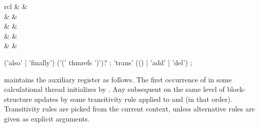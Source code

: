 \begin{isabellebody}
\begin{isamarkuptext}
  \begin{matharray}{rcl}
    \hyperlink{command.also}{\mbox{}} & \equiv & \hyperlink{command.note}{\mbox{}}~ \\
    \hyperlink{command.also}{\mbox{}} & \equiv & \hyperlink{command.note}{\mbox{}}~ \\[0.5ex]
    \hyperlink{command.finally}{\mbox{}} & \equiv & \hyperlink{command.also}{\mbox{}}~\hyperlink{command.from}{\mbox{}}~ \\[0.5ex]
    \hyperlink{command.moreover}{\mbox{}} & \equiv & \hyperlink{command.note}{\mbox{}}~ \\
    \hyperlink{command.ultimately}{\mbox{}} & \equiv & \hyperlink{command.moreover}{\mbox{}}~\hyperlink{command.from}{\mbox{}}~ \\
  \end{matharray}

  \begin{rail}
    ('also' | 'finally') ('(' thmrefs ')')?
    ;
    'trans' (() | 'add' | 'del')
    ;
  \end{rail}

  \begin{descr}

  \item [\hyperlink{command.also}{\mbox{\isa{\isacommand{also}}}}~\isa{{\isachardoublequote}{\isacharparenleft}a\isactrlsub {\isadigit{1}}\ {\isasymdots}\ a\isactrlsub n{\isacharparenright}{\isachardoublequote}}]
  maintains the auxiliary \hyperlink{fact.calculation}{\mbox{}} register as follows.
  The first occurrence of \hyperlink{command.also}{\mbox{}} in some calculational
  thread initializes \hyperlink{fact.calculation}{\mbox{}} by \hyperlink{fact.this}{\mbox{}}. Any
  subsequent \hyperlink{command.also}{\mbox{}} on the same level of block-structure
  updates \hyperlink{fact.calculation}{\mbox{}} by some transitivity rule applied to
  \hyperlink{fact.calculation}{\mbox{}} and \hyperlink{fact.this}{\mbox{}} (in that order).  Transitivity
  rules are picked from the current context, unless alternative rules
  are given as explicit arguments.


\end{descr}
\end{isamarkuptext}
\end{isabellebody}
